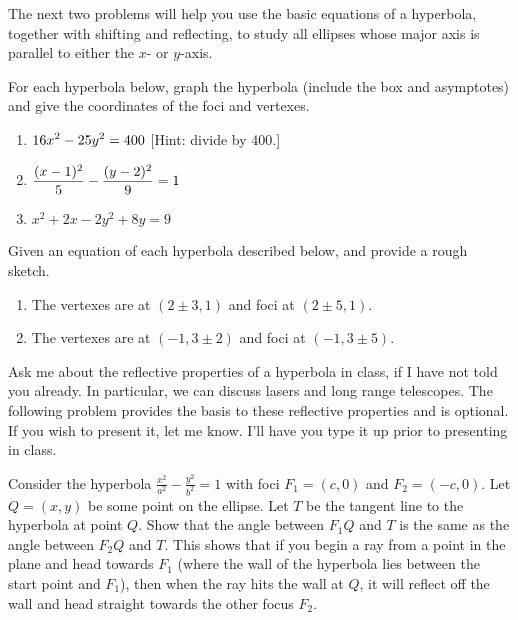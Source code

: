 The next two problems will help you use the basic equations of a hyperbola, together with shifting and reflecting, to study all ellipses whose major axis is parallel to either the $x$- or $y$-axis. 

\begin{problem} 
For each hyperbola below, graph the hyperbola (include the box and asymptotes) and give the coordinates of the foci and vertexes. 
\begin{enumerate}
\item $\displaystyle 16x^2-25y^2=400$ [Hint: divide by 400.]
\item $\displaystyle \frac{(x-1)^2}{5}-\frac{(y-2)^2}{9}=1$
\item $x^2+2x-2y^2+8y=9$
\end{enumerate}
\end{problem}

\begin{problem} 
Given an equation of each hyperbola described below, and provide a rough sketch.
\begin{enumerate}
\item The vertexes are at $(2\pm 3,1)$ and foci at $(2\pm 5, 1)$.
\item The vertexes are at $(-1,3\pm 2)$ and foci at $(-1, 3\pm 5)$.
\end{enumerate}
\end{problem}

Ask me about the reflective properties of a hyperbola in class, if I have not told you already. In particular, we can discuss lasers and long range telescopes. The following problem provides the basis to these reflective properties and is optional.  If you wish to present it, let me know. I'll have you type it up prior to presenting in class.

\begin{problem}[Optional]
Consider the hyperbola $\frac{x^2}{a^2}-\frac{y^2}{b^2}=1$ with foci $F_1=(c,0)$ and $F_2=(-c,0)$. 
Let $Q=(x,y)$ be some point on the ellipse. 
Let $T$ be the tangent line to the hyperbola at point $Q$. 
Show that the angle between $F_1Q$ and $T$ is the same as the angle between $F_2Q$ and $T$. This shows that if you begin a ray from a point in the plane and head towards $F_1$ (where the wall of the hyperbola lies between the start point and $F_1$), then when the ray hits the wall at $Q$, it will reflect off the wall and head straight towards the other focus $F_2$.
\end{problem}

